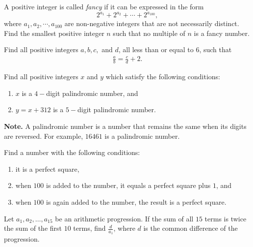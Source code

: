 \documentclass[problems.tex]{subfile}
\begin{document}
	
	\begin{problem}[APMO 2016]
		A positive integer is called \textit{fancy} if it can be expressed in the form $$2^{a_1}+2^{a_2}+ \cdots+ 2^{a_{100}},$$where $a_1,a_2, \cdots, a_{100}$ are non-negative integers that are not necessarily distinct. Find the smallest positive integer $n$ such that no multiple of $n$ is a fancy number. %
	\end{problem}
	
	
	
	\begin{problem}
		Find all positive integers $a,b,c,$ and $d$, all less than or equal to $6$, such that
		\begin{align*}
			\frac{a}{b} = \frac{c}{d} + 2.
		\end{align*}
	\end{problem}
	
	
	
	\begin{problem}
		Find all positive integers $x$ and $y$ which satisfy the following conditions:
		\begin{enumerate}
			\item $x$ is a $4-$digit palindromic number, and
			\item $y=x+312$ is a $5-$digit palindromic number.
		\end{enumerate}
		\textbf{Note.} A palindromic number is a number that remains the same when its digits are reversed. For example, $16461$ is a palindromic number.
	\end{problem}
	
	
	\begin{problem}
		Find a number with the following conditions:
		\begin{enumerate}
			\item it is a perfect square,
			\item when $100$ is added to the number, it equals a perfect square plus $1$, and
			\item when $100$ is again added to the number, the result is a perfect square.
		\end{enumerate}
	\end{problem}
	
	
	\begin{problem}
		Let $a_1, a_2, \dots, a_{15}$ be an arithmetic progression. If the sum of all $15$ terms is twice the sum of the first $10$ terms, find $\frac{d}{a_1}$, where $d$ is the common difference of the progression.
	\end{problem}
	
\end{document}
